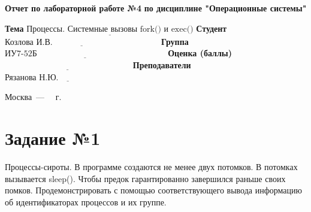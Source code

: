 \documentclass[12pt]{report}
\begin{document}
\begin{titlepage}
	
	\begin{center}
		\noindent\begin{minipage}{1.3\textwidth}\centering
			\Large\textbf{  Отчет по лабораторной работе №4}\newline
			\textbf{по дисциплине "Операционные системы"}\newline\newline
		\end{minipage}
	\end{center}
	
	\noindent\textbf{Тема} $\underline{\text{Процессы. Системные вызовы fork() и exec()}}$\newline\newline
	\noindent\textbf{Студент} $\underline{\text{Козлова И.В.~~~~~~~~~~~~~~~~~~~~~~~~~~~~~~~~~~~~~~}}$\newline\newline
	\noindent\textbf{Группа} $\underline{\text{ИУ7-52Б~~~~~~~~~~~~~~~~~~~~~~~~~~~~~~~~~~~~~~~~~~~~~~}}$\newline\newline
	\noindent\textbf{Оценка (баллы)} $\underline{\text{~~~~~~~~~~~~~~~~~~~~~~~~~~~~~~~~~~~~~~~~~~~~~}}$\newline\newline
	\noindent\textbf{Преподаватели} $\underline{\text{Рязанова Н.Ю.~~~~~~~~~~~~~~~~~~~~~~~~~~}}$\newline\newline\newline
	
	\begin{center}
		\vfill
		Москва~---~\the\year
		~г.
	\end{center}
\end{titlepage}

\newpage
\setcounter{page}{2}
\section*{Задание №1}

Процессы-сироты. В программе создаются не менее двух потомков. В потомках вызывается sleep(). Чтобы предок гарантированно завершился раньше своих помков. Продемонстрировать с помощью соответствующего вывода информацию об идентификаторах процессов и их группе.
\end{document}
